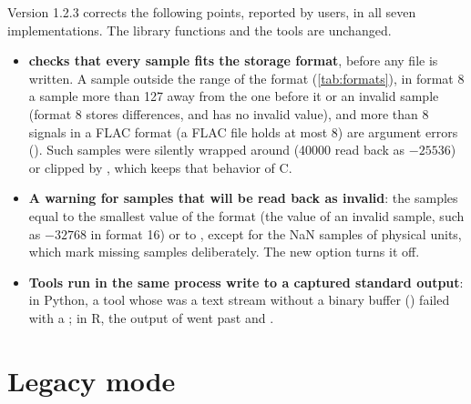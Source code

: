 Version 1.2.3 corrects the following points, reported by users, in all seven
implementations. The library functions and the tools are unchanged.
\begin{itemize}
\item \textbf{ checks that every sample fits the storage
  format}, before any file is written. A sample outside the range of the
  format (\cref{tab:formats}), in format 8 a sample more than 127 away from
  the one before it or an invalid sample (format 8 stores differences, and
  has no invalid value), and more than 8 signals in a FLAC format (a FLAC
  file holds at most 8) are argument errors (). Such samples
  were silently wrapped around (40000 read back as $-25536$) or clipped by
  , which keeps that behavior of C.
\item \textbf{A warning for samples that will be read back as invalid}: the
  samples equal to the smallest value of the format (the value of an invalid
  sample, such as $-32768$ in format 16) or to ,
  except for the NaN samples of physical units, which mark missing samples
  deliberately. The new option  turns it off.
\item \textbf{Tools run in the same process write to a captured standard
  output}: in Python, a tool whose  was a text stream
  without a binary buffer () failed with a
  ; in R, the output of  went past
   and .
\end{itemize}

\section{Legacy mode}
\label{sec:legacy}

